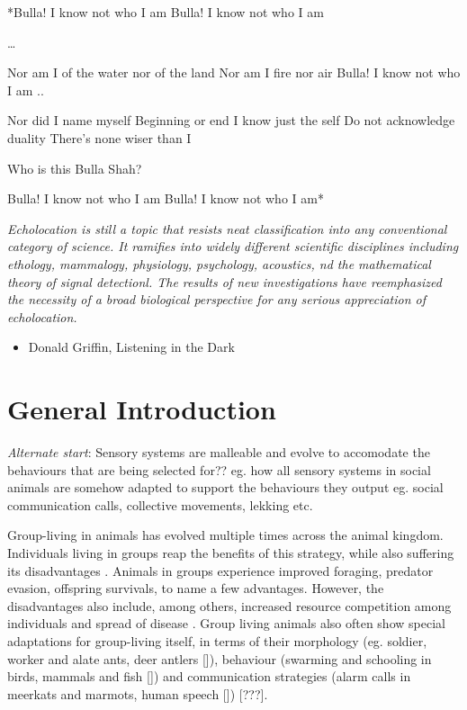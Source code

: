 \documentclass[
]{book}
\providecommand{\tightlist}{%
  \setlength{\itemsep}{0pt}\setlength{\parskip}{0pt}}
\begin{document}
*Bulla! I know not who I am
Bulla! I know not who I am

\ldots{}

Nor am I of the water nor of the land
Nor am I fire nor air
Bulla! I know not who I am
..

Nor did I name myself
Beginning or end I know just the self
Do not acknowledge duality
There's none wiser than I

Who is this Bulla Shah?

Bulla! I know not who I am
Bulla! I know not who I am*

\emph{Echolocation is still a topic that resists neat classification into any conventional category of science. It ramifies into widely different scientific disciplines including ethology, mammalogy, physiology, psychology, acoustics, nd the mathematical theory of signal detectionl. The results of new investigations have reemphasized the necessity of a broad biological perspective for any serious appreciation of echolocation.}

\begin{itemize}
\tightlist
\item
  Donald Griffin, Listening in the Dark
\end{itemize}

\newpage

\hypertarget{general-introduction}{%
\chapter{General Introduction}\label{general-introduction}}

\emph{Alternate start}: Sensory systems are malleable and evolve to accomodate the behaviours that are being selected for?? eg. how all sensory systems in social animals are somehow adapted to support the behaviours they output eg. social communication calls, collective movements, lekking etc.

Group-living in animals has evolved multiple times across the animal kingdom. Individuals living in groups reap the benefits of this strategy, while also suffering its disadvantages \citep[?]{Krebs}. Animals in groups experience improved foraging, predator evasion, offspring survivals, to name a few advantages. However, the disadvantages also include, among others, increased resource competition among individuals and spread of disease \citep[?]{Krebs}. Group living animals also often show special adaptations for group-living itself, in terms of their morphology (eg. soldier, worker and alate ants, deer antlers {[}{]}), behaviour (swarming and schooling in birds, mammals and fish {[}{]}) and communication strategies (alarm calls in meerkats and marmots, human speech {[}{]}) {[}???{]}.
\end{document}
